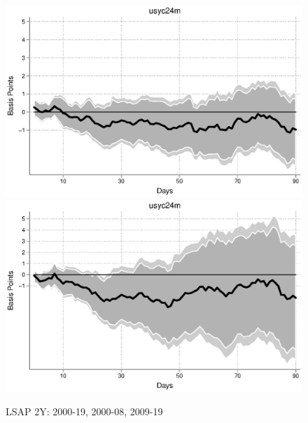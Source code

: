 \documentclass{article}
\begin{document}
\begin{figure}[tbph]
\begin{center}
	\end{center}
\end{figure}

\pagebreak[4]

\begin{figure}[tbph]
	\begin{center}
		\caption{LSAP 2Y: 2000-19, 2000-08, 2009-19}
		\includegraphics[trim={0cm 0cm 0cm 0cm},clip,height=0.3\textheight,width=1\textwidth]{../LagDep-FX/LSAP/US/usyc24m00-19lsap.eps} \\
		\includegraphics[trim={0cm 0cm 0cm 0cm},clip,height=0.3\textheight,width=1\textwidth]{../LagDep-FX/LSAP/US/usyc24m00-08lsap.eps} \\

\end{center}
\end{figure}
\end{document}
